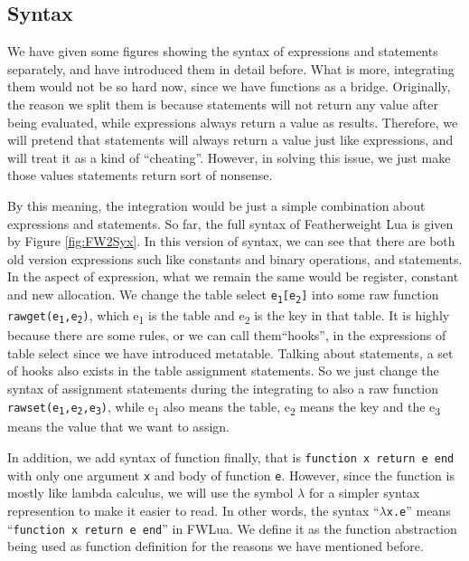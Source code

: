 \subsection{Syntax}\label{sec: FWLUAsyntax}
We have given some figures showing the syntax of expressions and statements separately, and have introduced them in detail before. What is more, integrating them would not be so hard now, since we have functions as a bridge. Originally, the reason we split them is because statements will not return any value after being evaluated, while expressions always return a value as results. Therefore, we will pretend that statements will always return a value just like expressions, and will treat it as a kind of ``cheating''. However, in solving this issue, we just make those values statements return sort of nonsense.

By this meaning, the integration would be just a simple combination about expressions and statements. So far, the full syntax of Featherweight Lua is given by Figure \ref{fig:FW2Syx}. In this version of syntax, we can see that there are both old version expressions such like constants and binary operations, and statements. In the aspect of expression, what we remain the same would be register, constant and new allocation. We change the table select {\tt e\textsubscript{1}[e\textsubscript{2}]} into some raw function {\tt rawget(e\textsubscript{1},e\textsubscript{2})}, which e\textsubscript{1} is the table and e\textsubscript{2} is the key in that table. It is highly because there are some rules, or we can call them``hooks'', in the expressions of table select since we have introduced metatable. Talking about statements, a set of hooks also exists in the table assignment statements. So we just change the syntax of assignment statements during the integrating to also a raw function {\tt rawset(e\textsubscript{1},e\textsubscript{2},e\textsubscript{3})}, while e\textsubscript{1} also means the table, e\textsubscript{2} means the key and the e\textsubscript{3} means the value that we want to assign. 

In addition, we add syntax of function finally, that is {\tt function x return e end} with only one argument {\tt x} and body of function {\tt e}. However, since the function is mostly like lambda calculus, we will use the symbol $\lambda$ for a simpler syntax represention to make it easier to read. In other words, the syntax ``{\tt $\lambda$x.e}'' means ``{\tt function x return e end}'' in FWLua. We define it as the function abstraction being used as function definition for the reasons we have mentioned before. 


